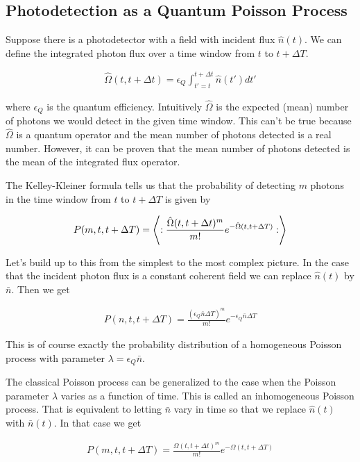 \documentclass[12pt]{article}
\begin{document}
\subsection{Photodetection as a Quantum Poisson Process}

Suppose there is a photodetector with a field with incident flux $\hat{n}(t)$. We can define the integrated photon flux over a time window from $t$ to $t+\Delta T$.

\begin{align}
\hat{\Omega}(t,t+\Delta t) = \epsilon_Q \int_{t'=t}^{t+\Delta t} \hat{n}(t') dt'
\end{align}

where $\epsilon_Q$ is the quantum efficiency. Intuitively $\hat{\Omega}$ is the expected (mean) number of photons we would detect in the given time window. This can't be true because $\hat{\Omega}$ is a quantum operator and the mean number of photons detected is a real number. However, it can be proven that the mean number of photons detected is the mean of the integrated flux operator.

The Kelley-Kleiner formula tells us that the probability of detecting $m$ photons in the time window from $t$ to $t+\Delta T$ is given by

\begin{align}
P(m,t,t+\Delta T) = \Braket{:\frac{\hat{\Omega}(t,t+\Delta t)^m}{m!} e^{-\hat{\Omega}(t,t+\Delta T)} :}
\end{align}

Let's build up to this from the simplest to the most complex picture. In the case that the incident photon flux is a constant coherent field we can replace $\hat{n}(t)$ by $\bar{n}$. Then we get

\begin{align}
P(n,t,t+\Delta T) = \frac{(\epsilon_Q \bar{n} \Delta T)^m}{m!} e^{-\epsilon_Q \bar{n} \Delta T}
\end{align}

This is of course exactly the probability distribution of a homogeneous Poisson process with parameter $\lambda = \epsilon_Q \bar{n}$.

The classical Poisson process can be generalized to the case when the Poisson parameter $\lambda$ varies as a function of time. This is called an inhomogeneous Poisson process. That is equivalent to letting $\bar{n}$ vary in time so that we replace $\hat{n}(t)$ with $\bar{n}(t)$. In that case we get

\begin{align}
P(m,t,t+\Delta T) = \frac{\Omega(t,t+\Delta t)^m}{m!} e^{-\Omega(t,t+\Delta T)}
\end{align}
\end{document}
